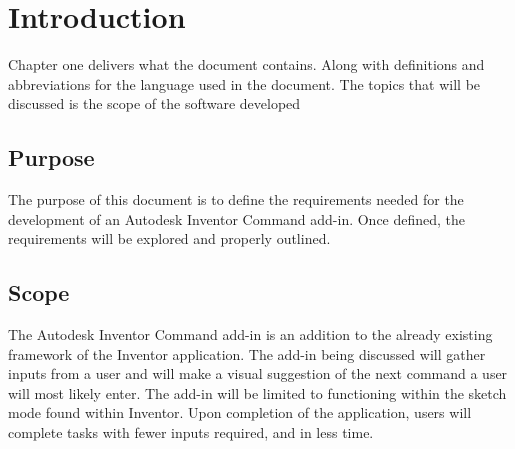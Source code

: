 \documentclass[onecolumn, draftclsnofoot,10pt, compsoc]{IEEEtran}
\begin{document}
\newpage
{}
\tableofcontents
\clearpage

\section{Introduction}

Chapter one delivers what the document contains. Along with definitions and abbreviations for the language used in the document. The topics that will be discussed is the scope of the software developed  

\subsection{Purpose}

The purpose of this document is to define the requirements needed for the development of an Autodesk Inventor Command add-in. Once defined, the requirements will be explored and properly outlined. 

\subsection{Scope}

The Autodesk Inventor Command add-in is an addition to the already existing framework of the Inventor application. The add-in being discussed will gather inputs from a user and will make a visual suggestion of the next command a user will most likely enter. The add-in will be limited to functioning within the sketch mode found within Inventor. Upon completion of the application, users will complete tasks with fewer inputs required, and in less time. 
\end{document}
